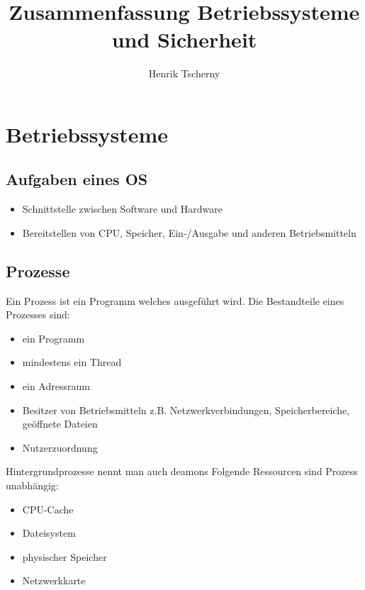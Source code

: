 \documentclass[12pt,a4paper]{article}
\title{Zusammenfassung Betriebssysteme und Sicherheit}
\author{Henrik Tscherny}
\begin{document}
\maketitle
\tableofcontents

\section{Betriebssysteme}
\subsection{Aufgaben eines OS}
\begin{itemize}
\item Schnittstelle zwischen Software und Hardware
\item Bereitstellen von CPU, Speicher, Ein-/Ausgabe und anderen Betriebsmitteln
\end{itemize}
\subsection{Prozesse}
Ein Prozess ist ein Programm welches ausgeführt wird.
Die Bestandteile eines Prozesses sind:
\begin{itemize}
\item ein Programm
\item mindestens ein Thread
\item ein Adressraum
\item Besitzer von Betriebsmitteln z.B. Netzwerkverbindungen, Speicherbereiche, geöffnete Dateien
\item Nutzerzuordnung
\end{itemize}
Hintergrundprozesse nennt man auch deamons
Folgende Ressourcen sind Prozess unabhängig:
\begin{itemize}
\item CPU-Cache
\item Dateisystem
\item physischer Speicher
\item Netzwerkkarte
\end{itemize}
\end{document}

